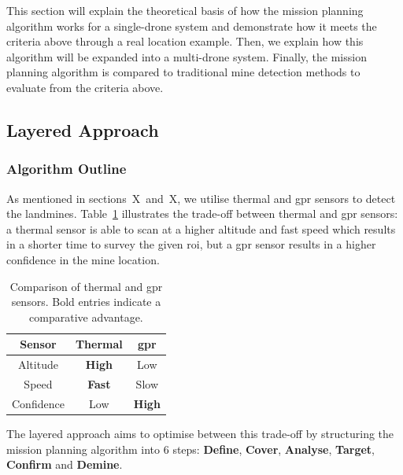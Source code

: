 This section will explain the theoretical basis of how the mission planning algorithm works for a single-drone system and demonstrate how it meets the criteria above through a real location example. Then, we explain how this algorithm will be expanded into a multi-drone system. Finally, the mission planning algorithm is compared to traditional mine detection methods to evaluate from the criteria above.  

\subsection{Layered Approach}
\label{sec:msp_layered_approach}

\subsubsection{Algorithm Outline}

As mentioned in sections~X~and~X, we utilise thermal and \gls{gpr} sensors to detect the landmines. Table~\ref{tab:thermal_vs_gpr} illustrates the trade-off between thermal and \gls{gpr} sensors: a thermal sensor is able to scan at a higher altitude and fast speed which results in a shorter time to survey the given \gls{roi}, but a \gls{gpr} sensor results in a higher confidence in the mine location. 

\begin{table}[h!]
    \centering
    \begin{tabular}{| c || c | c |}
        \hline
        Sensor & Thermal & \gls{gpr} \\
        \hline\hline
        Altitude & \textbf{High} & Low \\
        \hline
        Speed & \textbf{Fast} & Slow \\
        \hline
        Confidence & Low & \textbf{High} \\
        \hline
    \end{tabular}
    \caption[Comparison of Thermal and GPR Sensors]
    {Comparison of thermal and \gls{gpr} sensors. Bold entries indicate a comparative advantage.}
    \label{tab:thermal_vs_gpr}
\end{table}

The layered approach aims to optimise between this trade-off by structuring the mission planning algorithm into 6 steps: \textbf{Define}, \textbf{Cover}, \textbf{Analyse}, \textbf{Target}, \textbf{Confirm} and \textbf{Demine}. 

